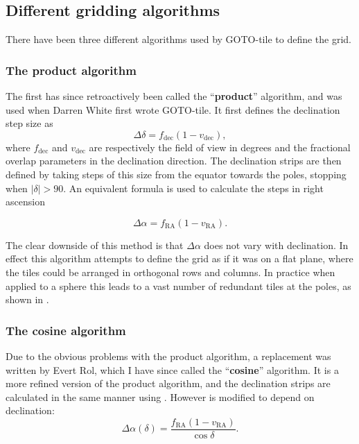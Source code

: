 
\subsection{Different gridding algorithms}
\label{sec:algorithms}
\begin{colsection}

There have been three different algorithms used by GOTO-tile to define the grid.

\subsubsection{The product algorithm}

The first has since retroactively been called the ``\textbf{product}'' algorithm, and was used when Darren White first wrote GOTO-tile. It first defines the declination step size as
%
\begin{equation}
    \Delta\delta = f_\text{dec}(1-v_\text{dec}),
    \label{eq:product_deltadelta}
\end{equation}
%
where $f_\text{dec}$ and $v_\text{dec}$ are respectively the field of view in degrees and the fractional overlap parameters in the declination direction. The declination strips are then defined by taking steps of this size from the equator towards the poles, stopping when $|\delta| > 90$. An equivalent formula is used to calculate the steps in right ascension

\begin{equation}
    \Delta\alpha = f_\text{RA}(1-v_\text{RA}).
    \label{eq:product_deltaalpha}
\end{equation}

The clear downside of this method is that $\Delta\alpha$ does not vary with declination. In effect this algorithm attempts to define the grid as if it was on a flat plane, where the tiles could be arranged in orthogonal rows and columns. In practice when applied to a sphere this leads to a vast number of redundant tiles at the poles, as shown in .

\subsubsection{The cosine algorithm}

Due to the obvious problems with the product algorithm, a replacement was written by Evert Rol, which I have since called the ``\textbf{cosine}'' algorithm. It is a more refined version of the product algorithm, and the declination strips are calculated in the same manner using . However  is modified to depend on declination:
%
\begin{equation}
    \Delta\alpha(\delta) = \frac{f_\text{RA}(1-v_\text{RA})}{\cos \delta}.
    \label{eq:cosine_deltaalpha}
\end{equation}


\end{colsection}
